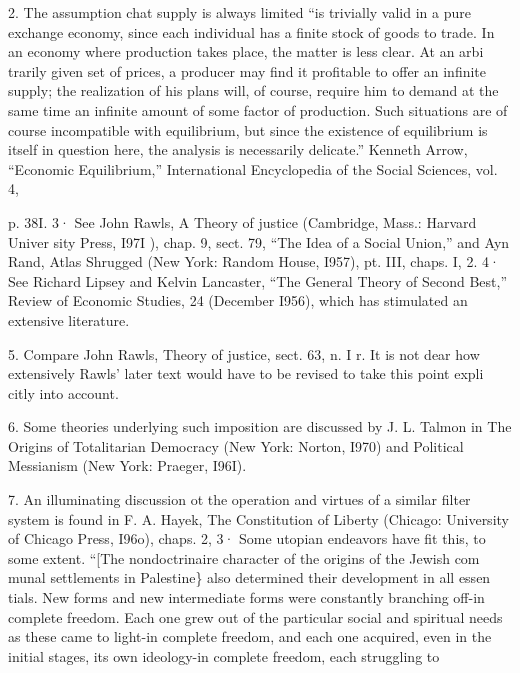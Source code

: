 \documentclass[11pt,openany]{book}
\begin{document}
{2. The assumption chat supply is always limited ``is trivially valid in a pure exchange economy, since each individual has a finite stock of goods to trade. In an economy where production takes place, the matter is less clear. At an arbi trarily given set of prices, a producer may find it profitable to offer an infinite supply; the realization of his plans will, of course, require him to demand at the same time an infinite amount of some factor of production. Such situations are of course incompatible with equilibrium, but since the existence of equilibrium is itself in question here, the analysis is necessarily delicate.'' Kenneth Arrow, ``Economic Equilibrium,'' International Encyclopedia of the Social Sciences, vol. 4,\par

p. 38I. 3· See John Rawls, A Theory of justice (Cambridge, Mass.: Harvard Univer sity Press, I97I ), chap. 9, sect. 79, ``The Idea of a Social Union,'' and Ayn Rand, Atlas Shrugged (New York: Random House, I957), pt. III, chaps. I, 2. 4· See Richard Lipsey and Kelvin Lancaster, ``The General Theory of Second Best,'' Review of Economic Studies, 24 (December I956), which has stimulated an extensive literature.\par

5. Compare John Rawls, Theory of justice, sect. 63, n. I r. It is not dear how extensively Rawls' later text would have to be revised to take this point expli citly into account.\par

6. Some theories underlying such imposition are discussed by J. L. Talmon in The Origins of Totalitarian Democracy (New York: Norton, I970) and Political Messianism (New York: Praeger, I96I).\par

7. An illuminating discussion ot the operation and virtues of a similar filter system is found in F. A. Hayek, The Constitution of Liberty (Chicago: University of Chicago Press, I96o), chaps. 2, 3· Some utopian endeavors have fit this, to some extent. ``[The nondoctrinaire character of the origins of the Jewish com munal settlements in Palestine\} also determined their development in all essen tials. New forms and new intermediate forms were constantly branching off-in complete freedom. Each one grew out of the particular social and spiritual needs as these came to light-in complete freedom, and each one acquired, even in the initial stages, its own ideology-in complete freedom, each struggling to\par

}
\end{document}
